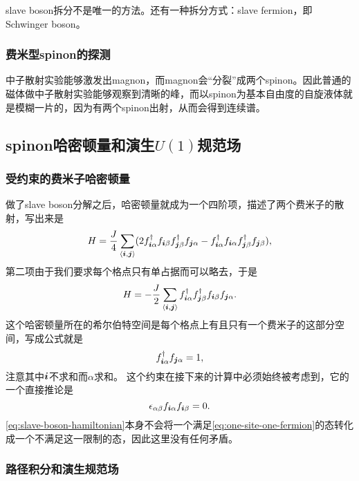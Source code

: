 slave boson拆分不是唯一的方法。还有一种拆分方式：slave fermion，即Schwinger boson。

\subsubsection{费米型spinon的探测}

中子散射实验能够激发出magnon，而magnon会“分裂”成两个spinon。因此普通的磁体做中子散射实验能够观察到清晰的峰，而以spinon为基本自由度的自旋液体就是模糊一片的，因为有两个spinon出射，从而会得到连续谱。

\subsection{spinon哈密顿量和演生$U(1)$规范场}

\subsubsection{受约束的费米子哈密顿量}

做了slave boson分解之后，哈密顿量就成为一个四阶项，描述了两个费米子的散射，写出来是
\[
    {H} = \frac{J}{4} \sum_{\langle \vb*{i}, \vb*{j} \rangle} (2 {f}^\dagger_{\vb*{i} \alpha} {f}_{\vb*{i} \beta} {f}_{\vb*{j} \beta}^\dagger {f}_{\vb*{j} \alpha} - {f}^\dagger_{\vb*{i} \alpha} {f}_{\vb*{i} \alpha} {f}^\dagger_{\vb*{j} \beta} {f}_{\vb*{j} \beta}),
\]
第二项由于我们要求每个格点只有单占据而可以略去，于是
\begin{equation}
    {H} = - \frac{J}{2} \sum_{\langle \vb*{i}, \vb*{j} \rangle} {f}_{\vb*{i} \alpha}^\dagger {f}_{\vb*{j} \beta}^\dagger {f}_{\vb*{i} \beta} {f}_{\vb*{j} \alpha}.
    \label{eq:slave-boson-hamiltonian}
\end{equation}
这个哈密顿量所在的希尔伯特空间是每个格点上有且只有一个费米子的这部分空间，写成公式就是
\begin{equation}
    f_{\vb*{i} \alpha}^\dagger f_{\vb*{j} \alpha} = 1, 
    \label{eq:one-site-one-fermion}
\end{equation}
注意其中$\vb*{i}$不求和而$\alpha$求和。
这个约束在接下来的计算中必须始终被考虑到，它的一个直接推论是
\begin{equation}
    \epsilon_{\alpha \beta} f_{\vb*{i} \alpha} f_{\vb*{i} \beta} = 0.
\end{equation}
\eqref{eq:slave-boson-hamiltonian}本身不会将一个满足\eqref{eq:one-site-one-fermion}的态转化成一个不满足这一限制的态，因此这里没有任何矛盾。

\subsubsection{路径积分和演生规范场}

